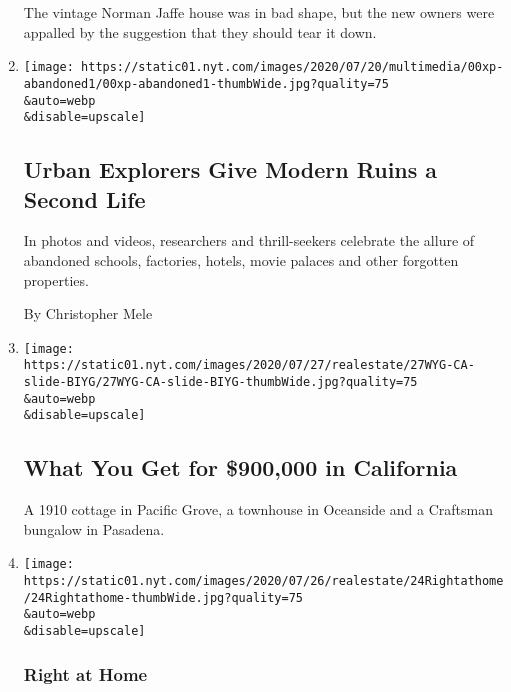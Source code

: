 \begin{enumerate}
  The vintage Norman Jaffe house was in bad shape, but the new owners
  were appalled by the suggestion that they should tear it down.
\item
  \href{/2020/07/27/us/abandoned-properties-to-explore.html}{}

  \texttt{[image: https://static01.nyt.com/images/2020/07/20/multimedia/00xp-abandoned1/00xp-abandoned1-thumbWide.jpg?quality=75\\\&auto=webp\\\&disable=upscale]}

  \hypertarget{urban-explorers-give-modern-ruins-a-second-life}{%
  \subsection{Urban Explorers Give Modern Ruins a Second
  Life}\label{urban-explorers-give-modern-ruins-a-second-life}}

  In photos and videos, researchers and thrill-seekers celebrate the
  allure of abandoned schools, factories, hotels, movie palaces and
  other forgotten properties.

  By Christopher Mele
\item
  \href{/slideshow/2020/07/27/realestate/what-you-get-for-900000-in-california.html}{}

  \texttt{[image: https://static01.nyt.com/images/2020/07/27/realestate/27WYG-CA-slide-BIYG/27WYG-CA-slide-BIYG-thumbWide.jpg?quality=75\\\&auto=webp\\\&disable=upscale]}

  \hypertarget{what-you-get-for-900000-in-california}{%
  \subsection{What You Get for \$900,000 in
  California}\label{what-you-get-for-900000-in-california}}

  A 1910 cottage in Pacific Grove, a townhouse in Oceanside and a
  Craftsman bungalow in Pasadena.
\item
  \href{/2020/07/24/realestate/pandemic-housekeeping.html}{}

  \texttt{[image: https://static01.nyt.com/images/2020/07/26/realestate/24Rightathome/24Rightathome-thumbWide.jpg?quality=75\\\&auto=webp\\\&disable=upscale]}

  \hypertarget{right-at-home}{%
  \subsubsection{Right at Home}\label{right-at-home}}

  \hypertarget{my-house-has-not-kept-up-with-the-pandemic}{%
}
\end{enumerate}

